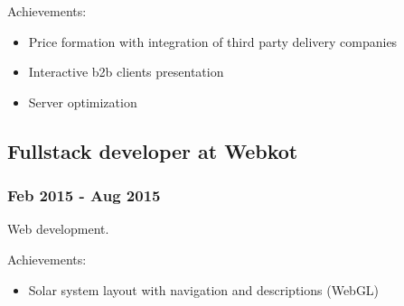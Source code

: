 \documentclass[letterpaper]{article}
\begin{document}
Achievements:
\begin{itemize}
\item Price formation with integration of third party delivery companies
\item Interactive b2b clients presentation
\item Server optimization
\end{itemize}

\subsection{Fullstack developer at Webkot}
\label{sec:orgccc96ed}
\subsubsection{Feb 2015 - Aug 2015}
\label{sec:org46e9e15}
Web development.

Achievements:
\begin{itemize}
\item Solar system layout with navigation and descriptions (WebGL)
\end{itemize}
\end{document}
